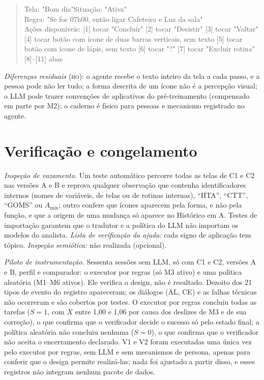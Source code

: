 \documentclass[conference]{IEEEtran}
\newcommand{\stHO}{\textsc{ho}}
\begin{document}
\begin{quote}\scriptsize\ttfamily
Tela: "Bom dia"\quad Situação: "Ativa"\\
Regra: "Se for 07h00, então ligar Cafeteira e Luz da sala"\\
Ações disponíveis: [1] tocar "Concluir" [2] tocar "Desistir" [3] tocar "Voltar" [4] tocar botão com ícone de duas barras verticais, sem texto [5] tocar botão com ícone de lápis, sem texto [6] tocar "?" [7] tocar "Excluir rotina" [8]--[11] abas
\end{quote}

\textit{Diferenças residuais} (\stHO): o agente recebe o texto inteiro da tela a cada passo, e a pessoa pode não ler tudo; a forma descrita de um ícone não é a percepção visual; o LLM pode trazer convenções de aplicativos do pré-treinamento (compensado em parte por M2); o caderno é físico para pessoas e mecanismo registrado no agente.

\section{Verificação e congelamento}\label{sec:verif}

\textit{Inspeção de vazamento.} Um teste automático percorre todas as telas de C1 e C2 nas versões A e B e reprova qualquer observação que contenha identificadores internos (nomes de variáveis, de telas ou de rotinas internas), ``HTA'', ``CTT'', ``GOMS'' ou $A_{\min}$; outro confere que ícones aparecem pela forma, e não pela função, e que a origem de uma mudança só aparece no Histórico em A. Testes de importação garantem que o tradutor e a política do LLM não importam os modelos do analista. \textit{Lista de verificação da ajuda:} cada signo de aplicação tem tópico. \textit{Inspeção semiótica:} não realizada (opcional).

\textit{Piloto de instrumentação.} Sessenta sessões sem LLM, só com C1 e C2, versões A e B, perfil e comparador: o executor por regras (só M3 ativo) e uma política aleatória (M1--M6 ativos). Ele verifica o design, não é resultado. Dezoito dos 21 tipos de evento do registro apareceram; os diálogos (AL, CE) e as falhas técnicas não ocorreram e são cobertos por testes. O executor por regras concluiu todas as tarefas ($S = 1$, com $X$ entre 1,00 e 1,06 por causa dos deslizes de M3 e de sua correção), o que confirma que o verificador decide o sucesso só pelo estado final; a política aleatória não concluiu nenhuma ($S = 0$), o que confirma que o verificador não aceita o encerramento declarado. V1 e V2 foram executadas uma única vez pelo executor por regras, sem LLM e sem mecanismos de persona, apenas para conferir que o design permite realizá-las; nada foi ajustado a partir disso, e esses registros não integram nenhum pacote de dados.
\end{document}

